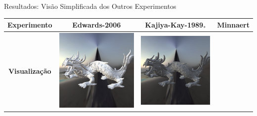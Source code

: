 \begin{frame}[fragile]{Resultados: Visão Simplificada dos Outros Experimentos}
   \begin{table}
       \centering
       \scriptsize %
       \begin{tabular}{|c|c|c|c|}
           \hline
           \textbf{Experimento}        & Edwards-2006     & Kajiya-Kay-1989$_*$   & Minnaert \\ \hline
           \textbf{Visualização} &
           \includegraphics[scale=0.14]{./Imagens/brdfs/edwards-2006-dragon.png} &
           \includegraphics[scale=0.14]{./Imagens/brdfs/aniso-dragon.png} &

\end{tabular}
\end{table}
\end{frame}

